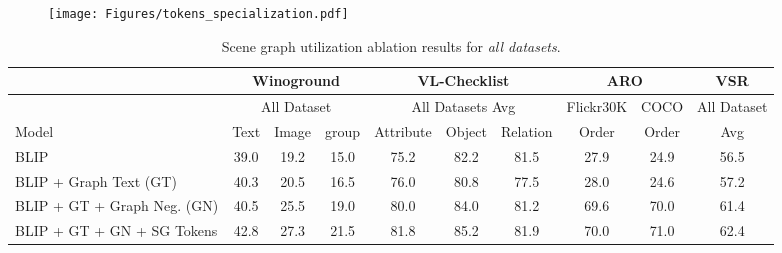 \documentclass[11pt]{article}
\newcommand{\tablestyle}[2]{\setlength{\tabcolsep}{#1}\renewcommand{\arraystretch}{#2}\centering\footnotesize}
\begin{document}
\begin{figure*}[t!]
\centering
    \texttt{[image: Figures/tokens\_specialization.pdf]}
    \label{supp:fig:token_specialization}
\end{figure*}

\begin{table*}[t!]
    \centering
	\tablestyle{3pt}{1.}
	\scriptsize
    \begin{small}
    \begin{tabular}{l|ccc|ccc|cc|c}
            \toprule
            &\multicolumn{3}{c|}{Winoground} & \multicolumn{3}{c|}{VL-Checklist} & \multicolumn{2}{c|}{ARO} & 
            \multicolumn{1}{c}{VSR}
            \\
            \toprule
            &\multicolumn{3}{c|}{All Dataset}
            &\multicolumn{3}{c|}{All Datasets Avg}
            & Flickr30K
            & COCO
            & All Dataset\\
            Model & Text & Image & group & Attribute & Object & Relation & Order & Order & Avg\\
            \midrule 
            BLIP  &39.0 &19.2 & 15.0 & 75.2 & 82.2 & 81.5 & 27.9 & 24.9 & 56.5\\
            BLIP + Graph Text (GT)  & 40.3 &20.5 & 16.5  & 76.0 & 80.8 & 77.5 & 28.0 & 24.6 & 57.2 \\
            BLIP + GT + Graph Neg. (GN)  & 40.5 &25.5 & 19.0  & 80.0 & 84.0 & 81.2 & 69.6 & 70.0 & 61.4 \\
            BLIP + GT + GN + SG Tokens &42.8 &27.3 & 21.5 & 81.8  & 85.2 & 81.9 & 70.0 & 71.0& 62.4\\
            \bottomrule        
    \end{tabular}
    \end{small}
\caption{Scene graph utilization ablation results for \textit{all datasets}.}
\label{supp:tab:graph_usage_all_datasets}
\end{table*} \begin{table*}[t!]
    \centering
	\tablestyle{0.8pt}{1.}
	\scriptsize
    \begin{small}
    \begin{tabular}{l|ccc|ccc|cc|c|c|c}

\end{tabular}
\end{small}
\end{table*}
\end{document}
